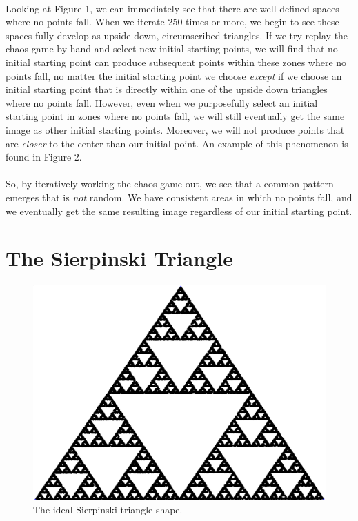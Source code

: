 \documentclass{article}
\begin{document}
\paragraph{}
Looking at Figure 1, we can immediately see that there are well-defined spaces where no points fall. When we iterate 250 times or more, we begin to see these spaces fully develop as upside down, circumscribed triangles. If we try replay the chaos game by hand and select new initial starting points, we will find that no initial starting point can produce subsequent points within these zones where no points fall, no matter the initial starting point we choose \textit{except} if we choose an initial starting point that is directly within one of the upside down triangles where no points fall. However, even when we purposefully select an initial starting point in zones where no points fall, we will still eventually get the same image as other initial starting points. Moreover, we will not produce points that are \textit{closer} to the center than our initial point. An example of this phenomenon is found in Figure 2.
\paragraph{}
 So, by iteratively working the chaos game out, we see that a common pattern emerges that is \textit{not} random. We have consistent areas in which no points fall, and we eventually get the same resulting image regardless of our initial starting point.
\section*{The Sierpinski Triangle}
\begin{figure}[H]
    \centering
    \includegraphics[width=.5\linewidth, height=.25\textheight]{ideal}
    \caption{The ideal Sierpinski triangle shape.}
\end{figure}
\end{document}
